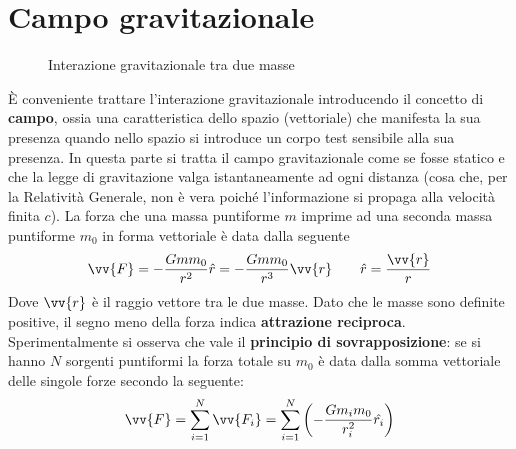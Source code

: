 \documentclass[a4paper, oneside]{book}
\begin{document}
\section{Campo gravitazionale}
\begin{figure}
    \centering
    \caption{Interazione gravitazionale tra due masse}
\end{figure}
È conveniente trattare l'interazione gravitazionale introducendo il concetto di \textbf{campo}, 
ossia una caratteristica dello spazio (vettoriale) che manifesta la sua presenza quando 
nello spazio si introduce un corpo test sensibile alla sua presenza. In questa parte
si tratta il campo gravitazionale come se fosse statico e che la legge di gravitazione valga
istantaneamente ad ogni distanza (cosa che, per la Relatività Generale, non è vera poiché l'informazione 
si propaga alla velocità finita $c$).
La forza che una massa puntiforme $m$ imprime ad una seconda massa puntiforme 
$m_0$ in forma vettoriale è data dalla seguente 
\begin{gather*}
    \vv{F} = - \frac{Gmm_0}{r^{2}}\hat{r} = - \frac{Gmm_0}{r^{3}}\vv{r}   \qquad \hat{r} = \frac{\vv{r} }{r} 
\end{gather*}
Dove $\vv{r}$ è il raggio vettore tra le due masse. Dato che le masse sono definite positive, il segno 
meno della forza indica \textbf{attrazione reciproca}. Sperimentalmente si osserva che
vale il \textbf{principio di sovrapposizione}: se si hanno $N$ sorgenti puntiformi
la forza totale su $m_0$ è data dalla somma vettoriale delle singole forze secondo la seguente:
\begin{align}
    \vv{F} = \sum_{i = 1}^{N}\vv{F_i} = \sum_{i = 1}^{N} \left(-\frac{Gm_im_0}{r_i^{2}}\hat{r_i} \right)    
\end{align}
\end{document}
